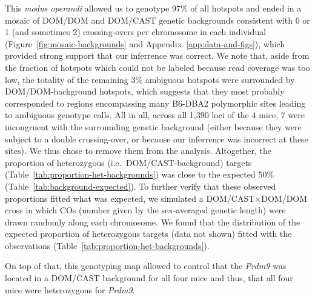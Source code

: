 \begin{mccorrection}
This \textit{modus operandi} allowed us to genotype 97\% of all hotspots and ended in a mosaic of DOM/DOM and DOM/CAST genetic backgrounds consistent with 0 or 1 (and sometimes 2) crossing-overs per chromosome in each individual (Figure~\ref{fig:mosaic-backgrounds} and Appendix~\ref{app:data-and-figs}), which provided strong support that our inferrence was correct.
We note that, aside from the fraction of hotspots which could not be labeled because read coverage was too low, the totality of the remaining 3\% ambiguous hotspots were surrounded by DOM/DOM-background hotspots, which suggests that they most probably corresponded to regions encompassing many B6-DBA2 polymorphic sites leading to ambiguous genotype calls.
All in all, across all 1,390 loci of the 4 mice, 7 were incongruent with the surrounding genetic background (either because they were subject to a double crossing-over, or because our inferrence was incorrect at these sites). We thus chose to remove them from the analysis.
Altogether, the proportion of heterozygous (i.e.\ DOM/CAST-background) targets (Table~\ref{tab:proportion-het-backgrounds}) was close to the expected 50\% (Table~\ref{tab:background-expected}).
To further verify that these observed proportions fitted what was expected, we simulated a DOM/CAST$\times$DOM/DOM cross in which COs (number given by the sex-averaged genetic length) were drawn randomly along each chromosome. We found that the distribution of the expected proportion of heterozygous targets (data not shown) fitted with the observations (Table~\ref{tab:proportion-het-backgrounds}).

On top of that, this genotyping map allowed to control that the \textit{Prdm9} was located in a DOM/CAST background for all four mice and thus, that all four mice were heterozygous for \textit{Prdm9}.

\end{mccorrection}



